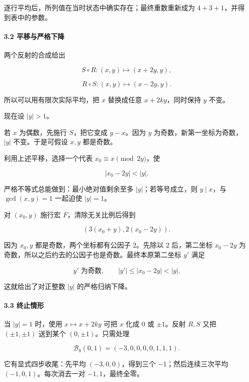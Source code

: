 \documentclass[11pt,a4paper]{article}
\theoremstyle{definition}
\numberwithin{equation}{section}
\begin{document}
{逐行平均后，所列值在当时状态中确实存在；最终重数重新成为} \(4+3+1\){，并得到表中的参数。}

\paragraph*{\texorpdfstring{{3.2} {平移与严格下降}}{3.2 平移与严格下降}}\label{C34-h228}

{两个反射的合成给出}

\[
S\circ R:(x,y)\longmapsto(x+2y,y),
\]

\[
R\circ S:(x,y)\longmapsto(x-2y,y).
\]

{所以可以用有限次实际平均，把} \(x\) {替换成任意} \(x+2ky\){，同时保持} \(y\) {不变。}

{现在设} \(|y|>1\){。}

{若} \(x\) {为偶数，先施行} \(S\){，把它变成} \(y-x\){。因为} \(y\) {为奇数，新第一坐标为奇数，}\(|y|\) {不变。于是可假设} \(x,y\) {都是奇数。}

{利用上述平移，选择一个代表} \(x_0\equiv x\pmod{2y}\){，使}

\[
|x_0-2y|<|y|.
\]

{严格不等式总能做到：最小绝对值剩余至多} \(|y|\){；若等号成立，则} \(y\mid x\){，与} \(\gcd(x,y)=1\) {一起迫使} \(|y|=1\){。}

{对} \((x_0,y)\) {施行宏} \(F\){，清除无关比例后得到}

\[
(3(x_0+y),2(x_0-2y)).
\]

{因为} \(x_0,y\) {都是奇数，两个坐标都有公因子} \(2\){。先除以} \(2\) {后，第二坐标} \(x_0-2y\) {为奇数，所以之后约去的公因子也是奇数。最终本原第二坐标} \(y'\) {满足}

\[
y'\text{ 为奇数},\qquad |y'|\le |x_0-2y|<|y|.
\]

{这就给出了对正整数} \(|y|\) {的严格归纳下降。}

\paragraph*{\texorpdfstring{{3.3} {终止情形}}{3.3 终止情形}}\label{C34-h229}

{当} \(|y|=1\) {时，使用} \(x\mapsto x+2ky\) {可把} \(x\) {化成} \(0\) {或} \(\pm1\){。反射} \(R,S\) {又把} \((\pm1,\pm1)\) {送到某个} \((0,\pm1)\){。只需处理}

\[
\mathcal B_8(0,1)=(-3,0,0,0,0,1,1,1).
\]

{它有显式四步收尾：先平均} \((-3,0,0)\){，得到三个} \(-1\){；然后连续三次平均} \((-1,0,1)\){。每次消去一对} \(-1,1\){，最终全零。}
\end{document}
